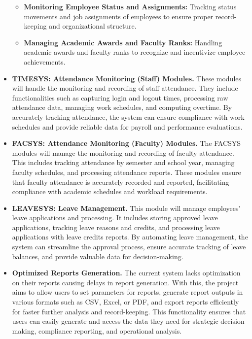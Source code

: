 \begin{itemize}
\begin{itemize}
            \item[] \textbf{Monitoring Employee Status and Assignments:  } Tracking status movements and job assignments of employees to ensure proper record-keeping and organizational structure.
            
            \item[] \textbf{Managing Academic Awards and Faculty Ranks: } Handling academic awards and faculty ranks to recognize and incentivize employee achievements.
        \end{itemize}


        \item[] \textbf{TIMESYS: Attendance Monitoring (Staff) Modules.} These modules will handle the monitoring and recording of staff attendance. They include functionalities such as capturing login and logout times, processing raw attendance data, managing work schedules, and computing overtime. By accurately tracking attendance, the system can ensure compliance with work schedules and provide reliable data for payroll and performance evaluations.
        \item[] \textbf{FACSYS: Attendance Monitoring (Faculty) Modules.} The FACSYS modules will manage the monitoring and recording of faculty attendance. This includes tracking attendance by semester and school year, managing faculty schedules, and processing attendance reports. These modules ensure that faculty attendance is accurately recorded and reported, facilitating compliance with academic schedules and workload requirements.
        \item[] \textbf{LEAVESYS: Leave Management.} This module will manage employees' leave applications and processing. It includes storing approved leave applications, tracking leave reasons and credits, and processing leave applications with leave credits reports. By automating leave management, the system can streamline the approval process, ensure accurate tracking of leave balances, and provide valuable data for decision-making.
        \item[] \textbf{Optimized Reports Generation.} The current system lacks optimization on their reports causing delays in report generation. With this, the project aims to allow users to set parameters for reports, generate report outputs in various formats such as CSV, Excel, or PDF, and export reports efficiently for faster further analysis and record-keeping. This functionality ensures that users can easily generate and access the data they need for strategic decision-making, compliance reporting, and operational analysis.
    \end{itemize}
    
